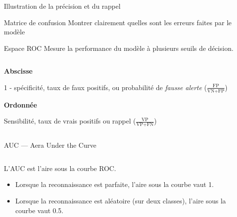 \begin{frame}{Illustration de la précision et du rappel}
\end{frame}

\begin{frame}{Matrice de confusion}
  Montrer clairement quelles sont les erreurs faites par le modèle
\end{frame}

\begin{frame}{Espace ROC}
  Mesure la performance du modèle à plusieurs seuils de décision.
  \begin{columns}
    \begin{column}{.48\textwidth}
      \textbf{Abscisse}

      1 - spécificité, taux de faux positifs, ou probabilité de \emph{fausse alerte} ($\frac{\text{FP}}{\text{VN} + \text{FP}}$)
 
      \vspace{1cm}
      \textbf{Ordonnée}
  
      Sensibilité, taux de vrais positifs ou rappel ($\frac{\text{VP}}{\text{VP} + \text{FN}}$)
    \end{column}
    \begin{column}{.52\textwidth}
    \end{column}
  \end{columns}
\end{frame}

\begin{frame}{AUC --- Aera Under the Curve}
  \begin{columns}
    \begin{column}{0.48\linewidth}
      L'AUC est l'aire sous la courbe ROC.
      \begin{itemize}
        \item Lorsque la reconnaissance est parfaite, l'aire sous la courbe vaut 1.
        \item Lorsque la reconnaissance est aléatoire (sur deux classes), l'aire sous la courbe vaut 0.5.
      \end{itemize}
    \end{column}
    \begin{column}{0.52\linewidth}
    \end{column}
  \end{columns}
\end{frame}


